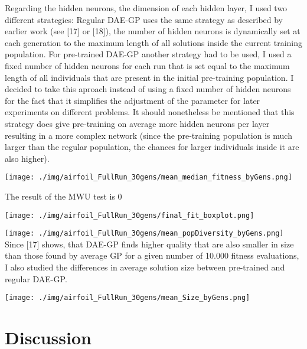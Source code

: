 \documentclass[
  11pt,
]{article}
\let\origfigure\figure
\let\endorigfigure\endfigure
\renewenvironment{figure}[1][2] {
    \expandafter\origfigure\expandafter[H]
} {
    \endorigfigure
}
\begin{document}
Regarding the hidden neurons, the dimension of each hidden layer, I used
two different strategies: Regular DAE-GP uses the same strategy as
described by earlier work (see {[}17{]} or {[}18{]}), the number of
hidden neurons is dynamically set at each generation to the maximum
length of all solutions inside the current training population. For
pre-trained DAE-GP another strategy had to be used, I used a fixed
number of hidden neurons for each run that is set equal to the maximum
length of all individuals that are present in the initial pre-training
population. I decided to take this aproach instead of using a fixed
number of hidden neurons for the fact that it simplifies the adjustment
of the parameter for later experiments on different problems. It should
nonetheless be mentioned that this strategy does give pre-training on
average more hidden neurons per layer resulting in a more complex
network (since the pre-training population is much larger than the
regular population, the chances for larger individuals inside it are
also higher).

\begin{figure}
\centering
\texttt{[image: ./img/airfoil\_FullRun\_30gens/mean\_median\_fitness\_byGens.png]}
\caption{Best Fitness over 30 Generations - Airfoil}
\end{figure}

The result of the MWU test is 0

\begin{figure}
\centering
\texttt{[image: ./img/airfoil\_FullRun\_30gens/final\_fit\_boxplot.png]}
\caption{Best Fitness Distribution after 30 Generations - Airfoil}
\end{figure}

\texttt{[image: ./img/airfoil\_FullRun\_30gens/mean\_popDiversity\_byGens.png]}
Since {[}17{]} shows, that DAE-GP finds higher quality that are also
smaller in size than those found by average GP for a given number of
10.000 fitness evaluations, I also studied the differences in average
solution size between pre-trained and regular DAE-GP.

\begin{figure}
\centering
\texttt{[image: ./img/airfoil\_FullRun\_30gens/mean\_Size\_byGens.png]}
\caption{Average Solution Size over 30 Generations - Airfoil}
\end{figure}

\hypertarget{discussion}{%
\section{Discussion}\label{discussion}}
\end{document}
